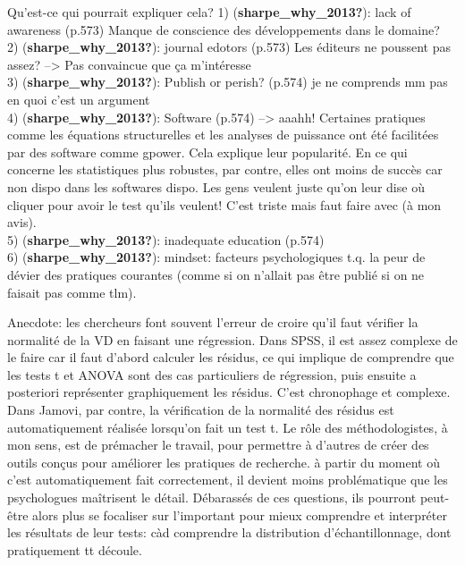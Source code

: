 \documentclass[
  english,
  man]{apa6}
\begin{document}
Qu'est-ce qui pourrait expliquer cela?
1) (\textbf{sharpe\_why\_2013?}): lack of awareness (p.573) Manque de conscience des développements dans le domaine?\\
2) (\textbf{sharpe\_why\_2013?}): journal edotors (p.573) Les éditeurs ne poussent pas assez? --\textgreater{} Pas convaincue que ça m'intéresse\\
3) (\textbf{sharpe\_why\_2013?}): Publish or perish? (p.574) je ne comprends mm pas en quoi c'est un argument\\
4) (\textbf{sharpe\_why\_2013?}): Software (p.574) --\textgreater{} aaahh! Certaines pratiques comme les équations structurelles et les analyses de puissance ont été facilitées par des software comme gpower. Cela explique leur popularité. En ce qui concerne les statistiques plus robustes, par contre, elles ont moins de succès car non dispo dans les softwares dispo. Les gens veulent juste qu'on leur dise où cliquer pour avoir le test qu'ils veulent! C'est triste mais faut faire avec (à mon avis).\\
5) (\textbf{sharpe\_why\_2013?}): inadequate education (p.574)\\
6) (\textbf{sharpe\_why\_2013?}): mindset: facteurs psychologiques t.q. la peur de dévier des pratiques courantes (comme si on n'allait pas être publié si on ne faisait pas comme tlm).

Anecdote: les chercheurs font souvent l'erreur de croire qu'il faut vérifier la normalité de la VD en faisant une régression. Dans SPSS, il est assez complexe de le faire car il faut d'abord calculer les résidus, ce qui implique de comprendre que les tests t et ANOVA sont des cas particuliers de régression, puis ensuite a posteriori représenter graphiquement les résidus. C'est chronophage et complexe. Dans Jamovi, par contre, la vérification de la normalité des résidus est automatiquement réalisée lorsqu'on fait un test t. Le rôle des méthodologistes, à mon sens, est de prémacher le travail, pour permettre à d'autres de créer des outils conçus pour améliorer les pratiques de recherche. à partir du moment où c'est automatiquement fait correctement, il devient moins problématique que les psychologues maîtrisent le détail. Débarassés de ces questions, ils pourront peut-être alors plus se focaliser sur l'important pour mieux comprendre et interpréter les résultats de leur tests: càd comprendre la distribution d'échantillonnage, dont pratiquement tt découle.
\end{document}
